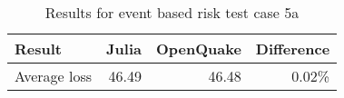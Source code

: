 \begin{table}[htbp]

\centering
\begin{tabular}{ l r r r }

\hline
\rowcolor{anti-flashwhite}
\bf{Result} & \bf{Julia} & \bf{OpenQuake} & \bf{Difference}\\
\hline
Average loss & 46.49 & 46.48 & 0.02\% \\
\hline
\end{tabular}

\caption{Results for event based risk test case 5a}
\label{tab:result-ebr-5a}
\end{table}
